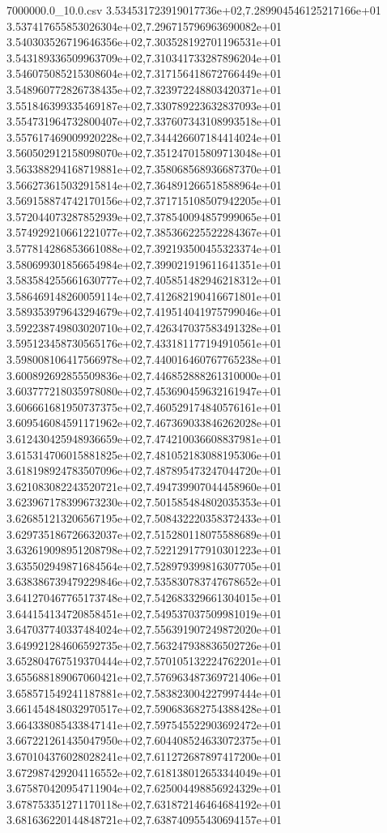 \begin{filecontents*}{7000000.0_10.0.csv}
3.534531723919017736e+02,7.289904546125217166e+01
3.537417655853026304e+02,7.296715796963690082e+01
3.540303526719646356e+02,7.303528192701196531e+01
3.543189336509963709e+02,7.310341733287896204e+01
3.546075085215308604e+02,7.317156418672766449e+01
3.548960772826738435e+02,7.323972248803420371e+01
3.551846399335469187e+02,7.330789223632837093e+01
3.554731964732800407e+02,7.337607343108993518e+01
3.557617469009920228e+02,7.344426607184414024e+01
3.560502912158098070e+02,7.351247015809713048e+01
3.563388294168719881e+02,7.358068568936687370e+01
3.566273615032915814e+02,7.364891266518588964e+01
3.569158874742170156e+02,7.371715108507942205e+01
3.572044073287852939e+02,7.378540094857999065e+01
3.574929210661221077e+02,7.385366225522284367e+01
3.577814286853661088e+02,7.392193500455323374e+01
3.580699301856654984e+02,7.399021919611641351e+01
3.583584255661630777e+02,7.405851482946218312e+01
3.586469148260059114e+02,7.412682190416671801e+01
3.589353979643294679e+02,7.419514041975799046e+01
3.592238749803020710e+02,7.426347037583491328e+01
3.595123458730565176e+02,7.433181177194910561e+01
3.598008106417566978e+02,7.440016460767765238e+01
3.600892692855509836e+02,7.446852888261310000e+01
3.603777218035978080e+02,7.453690459632161947e+01
3.606661681950737375e+02,7.460529174840576161e+01
3.609546084591171962e+02,7.467369033846262028e+01
3.612430425948936659e+02,7.474210036608837981e+01
3.615314706015881825e+02,7.481052183088195306e+01
3.618198924783507096e+02,7.487895473247044720e+01
3.621083082243520721e+02,7.494739907044458960e+01
3.623967178399673230e+02,7.501585484802035353e+01
3.626851213206567195e+02,7.508432220358372433e+01
3.629735186726632037e+02,7.515280118075588689e+01
3.632619098951208798e+02,7.522129177910301223e+01
3.635502949871684564e+02,7.528979399816307705e+01
3.638386739479229846e+02,7.535830783747678652e+01
3.641270467765173748e+02,7.542683329661304015e+01
3.644154134720858451e+02,7.549537037509981019e+01
3.647037740337484024e+02,7.556391907249872020e+01
3.649921284606592735e+02,7.563247938836502726e+01
3.652804767519370444e+02,7.570105132224762201e+01
3.655688189067060421e+02,7.576963487369721406e+01
3.658571549241187881e+02,7.583823004227997444e+01
3.661454848032970517e+02,7.590683682754388428e+01
3.664338085433847141e+02,7.597545522903692472e+01
3.667221261435047950e+02,7.604408524633072375e+01
3.670104376028028241e+02,7.611272687897417200e+01
3.672987429204116552e+02,7.618138012653344049e+01
3.675870420954711904e+02,7.625004498856924329e+01
3.678753351271170118e+02,7.631872146464684192e+01
3.681636220144848721e+02,7.638740955430694157e+01

\end{filecontents*}
